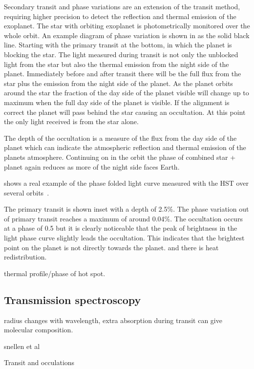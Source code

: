 Secondary transit and phase variations are an extension of the transit method, requiring higher precision to detect the reflection and thermal emission of the exoplanet. The star with orbiting exoplanet is photometrically monitored over the whole orbit. An example diagram of phase variation is shown in  as the solid black line. Starting with the primary transit at the bottom, in which the planet is blocking the star. The light measured during transit is not only the unblocked light from the star but also the thermal emission from the night side of the planet. Immediately before and after transit there will be the full flux from the star plus the emission from the night side of the planet. As the planet orbits around the star the fraction of the day side of the planet visible will change up to maximum when the full day side of the planet is visible. If the alignment is correct the planet will pass behind the star causing an occultation. At this point the only light received is from the star alone.

The depth of the occultation is a measure of the flux from the day side of the planet which can indicate the atmospheric reflection and thermal emission of the planets atmosphere.
Continuing on in the orbit the phase of combined star + planet again reduces as more of the night side faces Earth.

 shows a real example of the phase folded light curve measured with the HST over several orbits~\citep{stevenson_thermal_2014}.

The primary transit is shown inset with a depth of 2.5\%. The phase variation out of primary transit reaches a maximum of around 0.04\%. The occultation occurs at a phase of 0.5 but it is clearly noticeable that the peak of brightness in the light phase curve slightly leads the occultation. This indicates that the brightest point on the planet is not directly towards the planet. and there is heat redistribution.

thermal profile/phase of hot spot.



\subsection{Transmission spectroscopy}
radius changes with wavelength, extra absorption during transit can give molecular composition.

snellen  et al


Transit and occulations~\citet{winn_transits_2010}

